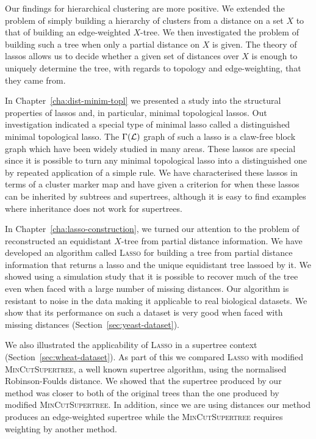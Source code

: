 Our findings for hierarchical clustering are more positive.  We extended the
problem of simply building a hierarchy of clusters from a distance on a set
$X$ to that of building an edge-weighted $X$-tree.  We then investigated the
problem of building such a tree when only a partial distance on $X$ is given.
The theory of lassos allows us to decide whether a given set of distances over
$X$ is enough to uniquely determine the tree, with regards to topology and
edge-weighting, that they came from.

In Chapter~\ref{cha:dist-minim-topl} we presented a study into the structural
properties of lassos and, in particular, minimal topological lassos.  Out
investigation indicated a special type of minimal lasso called a distinguished
minimal topological lasso.  The $\Gamma({\mathcal L})$ graph of such a lasso is a
claw-free block graph which have been widely studied in many areas.  These
lassos are special since it is possible to turn any minimal topological lasso
into a distinguished one by repeated application of a simple rule.  We have
characterised these lassos in terms of a cluster marker map and have given a
criterion for when these lassos can be inherited by subtrees and supertrees,
although it is easy to find examples where inheritance does not work for
supertrees.

In Chapter~\ref{cha:lasso-construction}, we turned our attention to the
problem of reconstructed an equidistant $X$-tree from partial distance
information.  We have developed an algorithm called \textsc{Lasso} for
building a tree from partial distance information that returns a lasso and the
unique equidistant tree lassoed by it.  We showed using a simulation study
that it is possible to recover much of the tree even when faced with a large
number of missing distances.  Our algorithm is resistant to noise in the data
making it applicable to real biological datasets.  We show that its
performance on such a dataset is very good when faced with missing distances
(Section~\ref{sec:yeast-dataset}).

We also illustrated the applicability of \textsc{Lasso} in a supertree context
(Section~\ref{sec:wheat-dataset}).  As part of this we compared \textsc{Lasso}
with modified \textsc{MinCutSupertree}, a well known supertree algorithm,
using the normalised Robinson-Foulds distance.  We showed that the supertree
produced by our method was closer to both of the original trees than the one
produced by modified \textsc{MinCutSupertree}.  In addition, since we are
using distances our method produces an edge-weighted supertree while the
\textsc{MinCutSupertree} requires weighting by another method.

